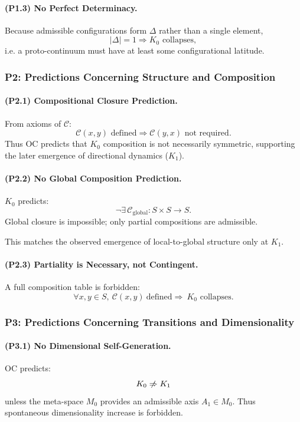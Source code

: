 \paragraph{(P1.3) No Perfect Determinacy.}
Because admissible configurations form $\Delta$ rather than a single element,
\[
|\Delta| = 1 \Rightarrow K_0 \text{ collapses},
\]
i.e. a proto-continuum must have at least some configurational latitude.

\subsubsection{P2: Predictions Concerning Structure and Composition}

\paragraph{(P2.1) Compositional Closure Prediction.}
From axioms of $\mathcal{C}$:
\[
\mathcal{C}(x,y) \text{ defined} \Rightarrow \mathcal{C}(y,x) \text{ not required}.
\]
Thus OC predicts that $K_0$ composition is not necessarily symmetric,  
supporting the later emergence of directional dynamics ($K_1$).

\paragraph{(P2.2) No Global Composition Prediction.}
$K_0$ predicts:
\[
\neg \exists\, \mathcal{C}_{\mathrm{global}} : S\times S\to S.
\]
Global closure is impossible; only partial compositions are admissible.

This matches the observed emergence of local-to-global structure only at $K_1$.

\paragraph{(P2.3) Partiality is Necessary, not Contingent.}
A full composition table is forbidden:
\[
\forall x,y\in S,\ \mathcal{C}(x,y)\ \text{defined}
\Rightarrow\ K_0 \text{ collapses}.
\]

\subsubsection{P3: Predictions Concerning Transitions and Dimensionality}

\paragraph{(P3.1) No Dimensional Self-Generation.}
OC predicts:
\[
K_0 \centernot\Rightarrow K_1
\]
unless the meta-space $M_0$ provides an admissible axis $A_1\in M_0$.  
Thus spontaneous dimensionality increase is forbidden.

